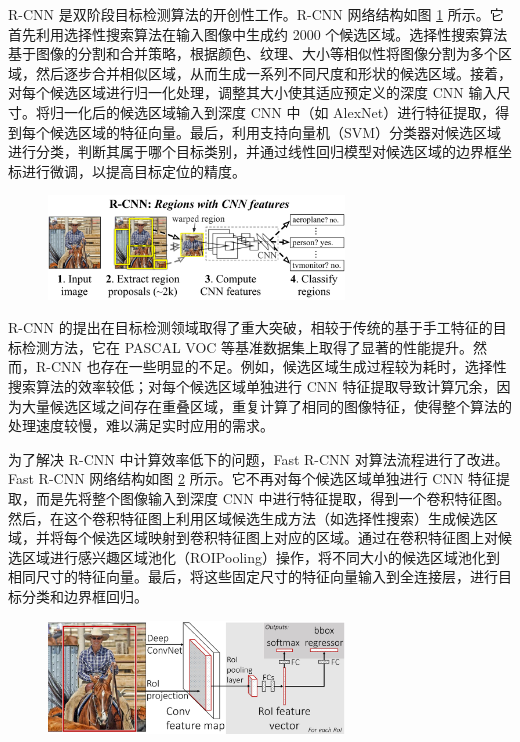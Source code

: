 R-CNN \cite{girshick2014rich, fast_rcnn, faster_rcnn, mask_rcnn}是双阶段目标检测算法的开创性工作。R-CNN 网络结构如图 \ref{fig:rcnn} 所示。它首先利用选择性搜索算法在输入图像中生成约 2000 个候选区域。选择性搜索算法基于图像的分割和合并策略，根据颜色、纹理、大小等相似性将图像分割为多个区域，然后逐步合并相似区域，从而生成一系列不同尺度和形状的候选区域。接着，对每个候选区域进行归一化处理，调整其大小使其适应预定义的深度 CNN 输入尺寸。将归一化后的候选区域输入到深度 CNN 中（如 AlexNet）进行特征提取，得到每个候选区域的特征向量。最后，利用支持向量机（SVM）\cite{svm}分类器对候选区域进行分类，判断其属于哪个目标类别，并通过线性回归模型对候选区域的边界框坐标进行微调，以提高目标定位的精度。

\begin{figure}[htbp]
    \centering
    \includegraphics[width=0.7\textwidth]{../figure/rcnn.png}
    \captionsetup{font=footnotesize}
    \label{fig:rcnn}
\end{figure}

R-CNN 的提出在目标检测领域取得了重大突破，相较于传统的基于手工特征的目标检测方法，它在 PASCAL VOC 等基准数据集上取得了显著的性能提升。然而，R-CNN 也存在一些明显的不足。例如，候选区域生成过程较为耗时，选择性搜索算法的效率较低；对每个候选区域单独进行 CNN 特征提取导致计算冗余，因为大量候选区域之间存在重叠区域，重复计算了相同的图像特征，使得整个算法的处理速度较慢，难以满足实时应用的需求。

为了解决 R-CNN 中计算效率低下的问题，Fast R-CNN 对算法流程进行了改进。Fast R-CNN 网络结构如图 \ref{fig:fastrcnn} 所示。它不再对每个候选区域单独进行 CNN 特征提取，而是先将整个图像输入到深度 CNN 中进行特征提取，得到一个卷积特征图。然后，在这个卷积特征图上利用区域候选生成方法（如选择性搜索）生成候选区域，并将每个候选区域映射到卷积特征图上对应的区域。通过在卷积特征图上对候选区域进行感兴趣区域池化（ROIPooling）操作，将不同大小的候选区域池化到相同尺寸的特征向量。最后，将这些固定尺寸的特征向量输入到全连接层，进行目标分类和边界框回归。

\begin{figure}[htbp]
    \centering
    \includegraphics[width=0.7\textwidth]{../figure/fastrcnn.png}
    \captionsetup{font=footnotesize}
    \label{fig:fastrcnn}
\end{figure}

